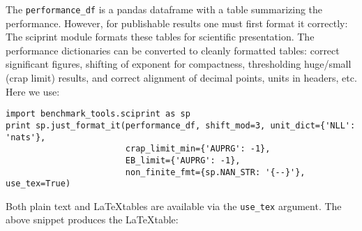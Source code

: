 \documentclass{article}
\newcommand{\code}{\texttt}
\begin{document}
The \code{performance\_df} is a pandas dataframe with a table summarizing the performance.
However, for publishable results one must first format it correctly:
The sciprint module formats these tables for scientific presentation.
The performance dictionaries can be converted to cleanly formatted tables: correct significant figures, shifting of exponent for compactness, thresholding huge/small (crap limit) results, and correct alignment of decimal points, units in headers, etc.
Here we use:
\begin{verbatim}
import benchmark_tools.sciprint as sp
print sp.just_format_it(performance_df, shift_mod=3, unit_dict={'NLL': 'nats'},
                        crap_limit_min={'AUPRG': -1},
                        EB_limit={'AUPRG': -1},
                        non_finite_fmt={sp.NAN_STR: '{--}'}, use_tex=True)
\end{verbatim}
Both plain text and \LaTeX tables are available via the \code{use\_tex} argument.
The above snippet produces the \LaTeX table:\\
\end{document}
